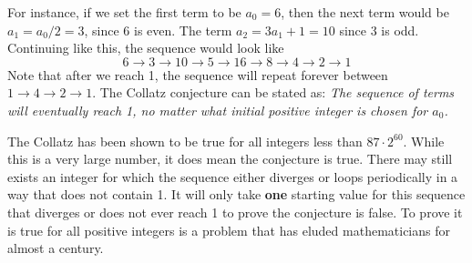 \documentclass{article}
\begin{document}
 	For instance, if we set the first term to be $a_0 = 6$, then the next term would be $a_1 = a_0/2 = 3$, since 6 is even.  The term $a_2 = 3a_1 + 1 = 10$ since 3 is odd.  Continuing like this, the sequence would look like
 	\[ 6 \rightarrow 3 \rightarrow 10 \rightarrow 5 \rightarrow 16 \rightarrow 8 \rightarrow 4 \rightarrow 2 \rightarrow 1\]
 	Note that after we reach 1, the sequence will repeat forever between $1 \rightarrow 4 \rightarrow 2 \rightarrow 1$.  The Collatz conjecture can be stated as: \textit{The sequence of terms will eventually reach 1, no matter what initial positive integer is chosen for $a_0$.}
 	
 	The Collatz has been shown to be true for all integers less than $87 \cdot 2^{60}$.  While this is a very large number, it does mean the conjecture is true.  There may still exists an integer for which the sequence either diverges or loops periodically in a way that does not contain 1.  It will only take \textbf{one} starting value for this sequence that diverges or does not ever reach 1 to prove the conjecture is false.  To prove it is true for all positive integers is a problem that has eluded mathematicians for almost a century.  
 	
 	
 	
 	
 	
 	
 	

	
	
	
	
	
	
	
	




\end{document}
